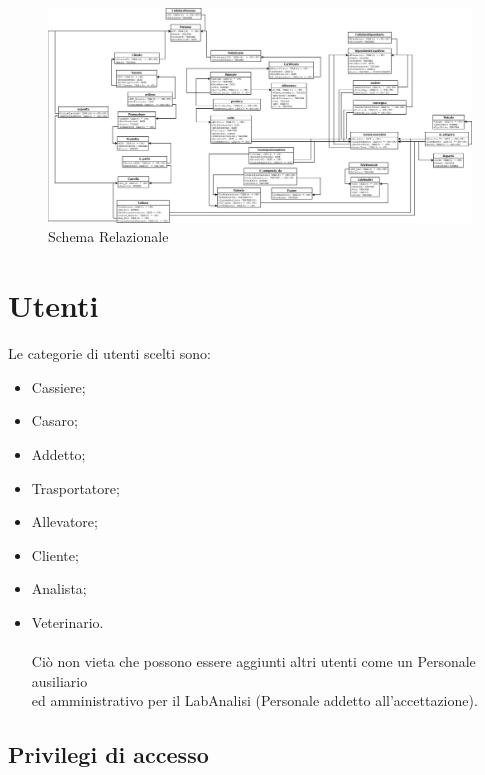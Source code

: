 \documentclass[12pt]{report}
\begin{document}
\begin{figure}[H]
\centering
\includegraphics[scale=0.33,angle=90]{imgs/sc_relazionale.jpeg}
\caption{Schema Relazionale}
\end{figure}


\section{Utenti}
Le categorie di utenti scelti sono:
\begin{itemize}
\item {Cassiere};
\item {Casaro};
\item {Addetto};
\item {Trasportatore};
\item {Allevatore};
\item {Cliente};
\item {Analista};
\item {Veterinario}. \\
\\
Ciò non vieta che possono essere aggiunti altri utenti come un Personale ausiliario \\
 ed amministrativo per il LabAnalisi (Personale addetto all'accettazione).
\end{itemize}






\subsection{Privilegi di accesso}
\end{document}
